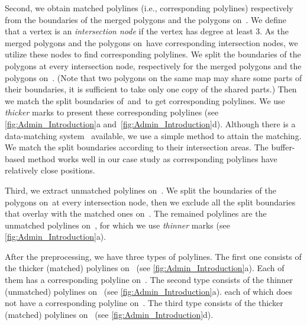 Second, we obtain matched polylines 
(i.e., corresponding polylines)
respectively from the boundaries of the 
merged polygons and the polygons on~\ms. 
We define that a vertex is an \emph{intersection node} 
if the vertex has degree at least 3. 
As the merged polygons and the polygons on~\ms have corresponding intersection nodes, we utilize these 
nodes to find corresponding polylines. 
We split the boundaries of the 
polygons at every intersection node, 
respectively for the merged polygons and the 
polygons on~\ms. 
(Note that two polygons on the same map may share some parts of 
their boundaries, it is sufficient to take only one copy of the shared parts.) 
Then we match the split boundaries of~\ml and~\ms  to get 
corresponding polylines. 
We use \emph{thicker} marks to 
present these corresponding polylines 
(see \figs\ref{fig:Admin_Introduction}a
and~\ref{fig:Admin_Introduction}d). 
Although there is a data-matching 
system~\parencite{Mustiere2008} 
available, we use a simple method to attain the matching. 
We match the split boundaries 
according to their intersection areas. 
The buffer-based method works well in our case study as 
corresponding polylines have relatively close positions.

Third, we extract unmatched polylines on~\ml. 
We split the boundaries of the polygons 
on~\ml at every intersection node, 
then we exclude all the split boundaries 
that overlay with the matched ones on~\ml. 
The remained polylines are the unmatched polylines on~\ml,
for which we use \emph{thinner} marks
(see \fig\ref{fig:Admin_Introduction}a). 

After the preprocessing, we have three types of polylines. 
The first one consists of 
the thicker (matched) polylines on~\ml
(see \fig\ref{fig:Admin_Introduction}a).
Each of them has a corresponding polyline on~\ms.
%
The second type consists of 
the thinner (unmatched) polylines on~\ml
(see \fig\ref{fig:Admin_Introduction}a).
each of which does not have a
corresponding polyline on~\ms.
%
The third type consists of 
the thicker (matched) polylines on~\ms
(see \fig\ref{fig:Admin_Introduction}d).


